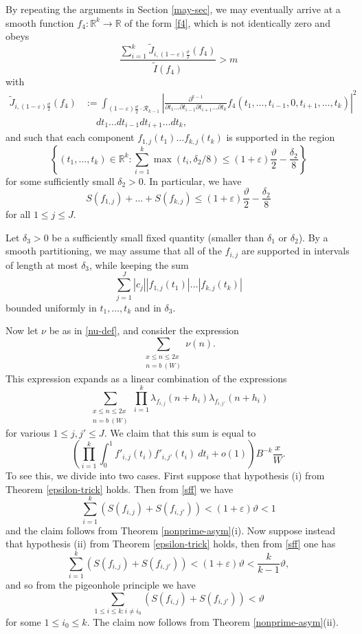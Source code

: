 \documentclass{bmcart}
\theoremstyle{plain}
\theoremstyle{definition}
\newcommand\R{\mathbb{R}}
\newcommand\eps{\varepsilon}
\begin{document}
By repeating the arguments in Section \ref{may-sec}, we may eventually arrive at a smooth function $f_4: \R^k \to \R$ of the form \eqref{f4}, which is not identically zero and obeys 
\begin{equation}\label{f4-ratio}
\frac{\sum_{i=1}^k \tilde J_{i,(1-\eps) \frac{\vartheta}{2}}(f_4)}{\tilde I(f_4)} > m
\end{equation}
with
\begin{align*}
 \tilde J_{i, (1-\eps) \frac{\vartheta}{2}}(f_4) &:= \int_{(1-\eps) \frac{\vartheta}{2} \cdot {\mathcal R}_{k-1}} \left|\frac{\partial^{k-1}}{\partial t_1 \dots \partial t_{i-1} \partial t_{i+1} \dots \partial t_k} f_4(t_1,\dots,t_{i-1}, 0, t_{i+1}, \dots, t_k)\right|^2\\
&\quad \ dt_1 \dots dt_{i-1} dt_{i+1} \dots dt_k,
\end{align*}
and such that each component $f_{1,j}(t_1) \dots f_{k,j}(t_k)$ is supported in the region
$$ \left\{ (t_1,\dots,t_k) \in \R^k: \sum_{i=1}^k \max(t_i, \delta_2/8) \leq (1+\eps) \frac{\vartheta}{2} - \frac{\delta_2}{8}\right\}$$
for some sufficiently small $\delta_2>0$.  In particular, we have
\begin{equation}\label{sff}
S(f_{1,j}) + \dots + S(f_{k,j}) \leq (1+\eps) \frac{\vartheta}{2} - \frac{\delta_2}{8}
\end{equation}
for all $1 \leq j \leq J$.  

Let $\delta_3 > 0$ be a sufficiently small fixed quantity (smaller than $\delta_1$ or $\delta_2$).  By a smooth partitioning, we may assume that all of the $f_{i,j}$ are supported in intervals of length at most $\delta_3$, while keeping the sum
\begin{equation}\label{abs-sum}
\sum_{j=1}^J |c_j| |f_{1,j}(t_1)| \dots |f_{k,j}(t_k)|
\end{equation}
bounded uniformly in $t_1,\dots,t_k$ and in $\delta_3$.

Now let $\nu$ be as in \eqref{nu-def}, and consider the expression
$$ \sum_{\substack{x \leq n \leq 2x\\ n = b\ (W)}} \nu(n).$$
This expression expands as a linear combination of the expressions
$$ \sum_{\substack{x \leq n \leq 2x\\ n = b\ (W)}} \prod_{i=1}^k \lambda_{f_{i,j}}(n+h_i) \lambda_{f_{i,j'}}(n+h_i)$$
for various $1 \leq j,j' \leq J$.  We claim that this sum is equal to
$$ \left(\prod_{i=1}^k \int_0^1 f'_{i,j}(t_i) f'_{i,j'}(t_i)\ dt_i + o(1)\right) B^{-k} \frac{x}{W}.$$
To see this, we divide into two cases.  First suppose that hypothesis (i) from Theorem \ref{epsilon-trick} holds.  Then from \eqref{sff} we have
$$ \sum_{i=1}^k (S(f_{i,j}) + S(f_{i,j'})) < (1+\eps) \vartheta < 1$$
and the claim follows from Theorem \ref{nonprime-asym}(i).  Now suppose instead that hypothesis (ii) from Theorem \ref{epsilon-trick} holds, then from \eqref{sff} one has
$$ \sum_{i=1}^k (S(f_{i,j}) + S(f_{i,j'})) < (1+\eps) \vartheta < \frac{k}{k-1} \vartheta,$$
and so from the pigeonhole principle we have
$$ \sum_{1 \leq i \leq k: i \neq i_0} (S(f_{i,j}) + S(f_{i,j'})) < \vartheta$$
for some $1 \leq i_0 \leq k$.  The claim now follows from Theorem \ref{nonprime-asym}(ii).
\end{document}
